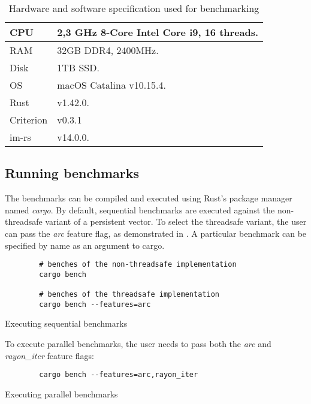 \begin{table}[!htbp]
    \centering

    \begin{tabular} { |l| p{11cm} | }
        \hline CPU & 2,3 GHz 8-Core Intel Core i9, 16 threads. \\ \hline
        RAM & 32GB DDR4, 2400MHz. \\ \hline
        Disk & 1TB SSD. \\ \hline
        OS & macOS Catalina v10.15.4. \\ \hline
        Rust & v1.42.0. \\ \hline
        Criterion & v0.3.1 \\ \hline
        im-rs & v14.0.0. \\ \hline
    \end{tabular}

    \label{tab:exec-environment}
    \caption{Hardware and software specification used for benchmarking}
\end{table}

\subsection{Running benchmarks}
The benchmarks can be compiled and executed using Rust's package manager named \emph{cargo}. By default, sequential benchmarks are executed against the non-threadsafe variant of a persistent vector. To select the threadsafe variant, the user can pass the \emph{arc} feature flag, as demonstrated in . A particular benchmark can be specified by name as an argument to cargo.

\begin{listing}[!htbp]

    \centering
    \begin{verbatim}
        # benches of the non-threadsafe implementation
        cargo bench

        # benches of the threadsafe implementation
        cargo bench --features=arc
    \end{verbatim}

    \caption{Executing sequential benchmarks}
    \label{lst:sequential-benches}
\end{listing}

To execute parallel benchmarks, the user needs to pass both the \emph{arc} and \emph{rayon\_iter} feature flags:
\begin{listing}[!htbp]

    \centering
    \begin{verbatim}
        cargo bench --features=arc,rayon_iter
    \end{verbatim}

    \caption{Executing parallel benchmarks}
    \label{lst:parallel-benches}
\end{listing}

